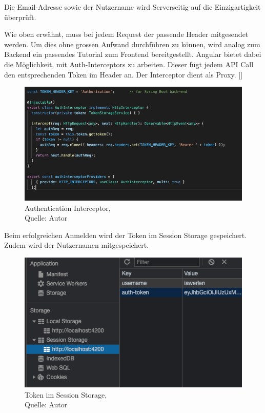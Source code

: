  Die Email-Adresse sowie der Nutzername wird Serverseitig auf die Einzigartigkeit überprüft. 
 
Wie oben erwähnt, muss bei jedem Request der passende Header mitgesendet werden. Um dies ohne grossen Aufwand durchführen zu können, wird analog zum Backend ein passendes Tutorial zum Frontend bereitgestellt. Angular bietet dabei die Möglichkeit, mit Auth-Interceptors zu arbeiten. Dieser fügt jedem API Call den entsprechenden Token im Header an. Der Interceptor dient als Proxy. [\cite{authAPIAngular}]

\begin{figure}[H]
	\centering
	\includegraphics[width=1\textwidth]{images/authInterceptor.PNG}
	\caption[Authentication Interceptor]{Authentication Interceptor,\\ Quelle: Autor}
	\label{img: authInterceptor}
\end{figure} 
  
Beim erfolgreichen Anmelden wird der Token im Session Storage gespeichert. Zudem wird der Nutzernamen mitgespeichert. 

\begin{figure}[H]
 	\centering
 	\includegraphics[width=1\textwidth]{images/sessionStorage.PNG}
 	\caption[Token im Session Storage]{Token im Session Storage,\\ Quelle: Autor}
 	\label{img: sessionStorage}
\end{figure} 
 
